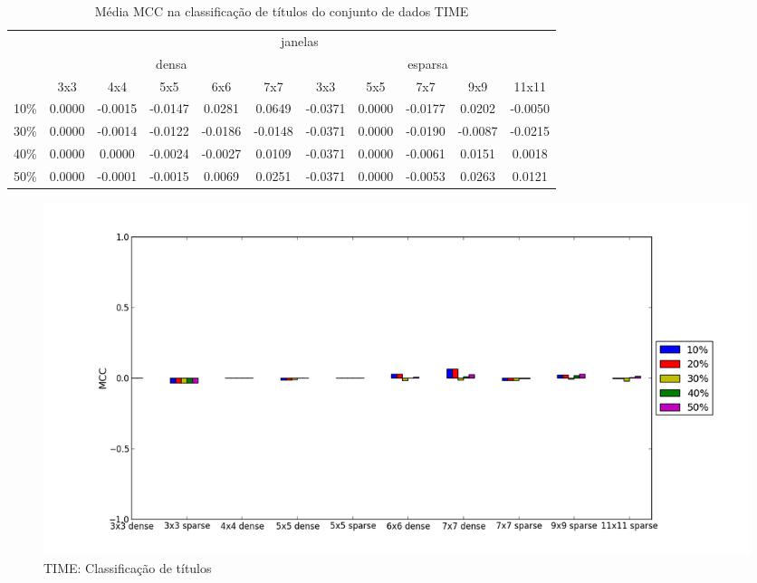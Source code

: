 \documentclass[a4paper,11pt]{article}
\begin{document}
  \begin{center}
    \begin{table}[p]
      \caption{Média MCC na classificação de títulos do conjunto de dados TIME}
      \begin{tabular}{ l | c c c c c || c c c c c | }
        \cline{2-11}
        & \multicolumn{10}{|c|}{janelas} \\
        \cline{2-11}
        & \multicolumn{5}{c||}{densa} & \multicolumn{5}{c|}{esparsa} \\
        \cline{2-11}
        & 3x3 & 4x4 & 5x5 & 6x6 & 7x7 & 3x3 & 5x5 & 7x7 & 9x9 & 11x11 \\
        \hline
        \multicolumn{1}{|l|}{10\%}& 0.0000& -0.0015& -0.0147& 0.0281& 0.0649& -0.0371& 0.0000& -0.0177& 0.0202& -0.0050\\
        \multicolumn{1}{|l|}{30\%}& 0.0000& -0.0014& -0.0122& -0.0186& -0.0148& -0.0371& 0.0000& -0.0190& -0.0087& -0.0215\\
        \multicolumn{1}{|l|}{40\%}& 0.0000& 0.0000& -0.0024& -0.0027& 0.0109& -0.0371& 0.0000& -0.0061& 0.0151& 0.0018\\
        \multicolumn{1}{|l|}{50\%}& 0.0000& -0.0001& -0.0015& 0.0069& 0.0251& -0.0371& 0.0000& -0.0053& 0.0263& 0.0121\\
        \hline  
      \end{tabular}
      \label{tab:time_mcc_heading}
    \end{table}
  \end{center}

  \begin{figure}[p]
    \centerline{\includegraphics[width=1.2\textwidth]{assets/experiment_charts/time_TextRegion_heading_mcc.png}}
    \caption{TIME: Classificação de títulos}
    \label{fig:time_TextRegion_heading_mcc}
  \end{figure}
\end{document}

